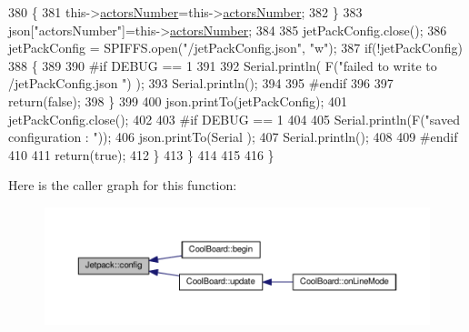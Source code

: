 \begin{DoxyCode}
380             \{
381                 this->\hyperlink{classJetpack_a52c86319cb3f7f1ab744a64db18a7ba5}{actorsNumber}=this->\hyperlink{classJetpack_a52c86319cb3f7f1ab744a64db18a7ba5}{actorsNumber};
382             \}
383             json[\textcolor{stringliteral}{"actorsNumber"}]=this->\hyperlink{classJetpack_a52c86319cb3f7f1ab744a64db18a7ba5}{actorsNumber};
384 
385             jetPackConfig.close();          
386             jetPackConfig = SPIFFS.open(\textcolor{stringliteral}{"/jetPackConfig.json"}, \textcolor{stringliteral}{"w"});            
387             \textcolor{keywordflow}{if}(!jetPackConfig)
388             \{
389             
390 \textcolor{preprocessor}{            #if DEBUG == 1 }
391 
392                 Serial.println( F(\textcolor{stringliteral}{"failed to write to /jetPackConfig.json "}) );
393                 Serial.println();
394             
395 \textcolor{preprocessor}{            #endif}
396                 
397                 \textcolor{keywordflow}{return}(\textcolor{keyword}{false});          
398             \}  
399 
400             json.printTo(jetPackConfig);
401             jetPackConfig.close();
402 
403 \textcolor{preprocessor}{        #if DEBUG == 1 }
404             
405             Serial.println(F(\textcolor{stringliteral}{"saved configuration : "}));
406             json.printTo(Serial );
407             Serial.println();       
408         
409 \textcolor{preprocessor}{        #endif}
410 
411             \textcolor{keywordflow}{return}(\textcolor{keyword}{true}); 
412         \}
413     \}   
414     
415 
416 \}
\end{DoxyCode}
Here is the caller graph for this function\+:\nopagebreak
\begin{figure}[H]
\begin{center}
\leavevmode
\includegraphics[width=350pt]{classJetpack_ab065ee83e244265a2223a22f3ee4a719_icgraph}
\end{center}
\end{figure}
\mbox{\label{classJetpack_a86d2e83436ef4b85f4c3a6e85ac785b0}} 
